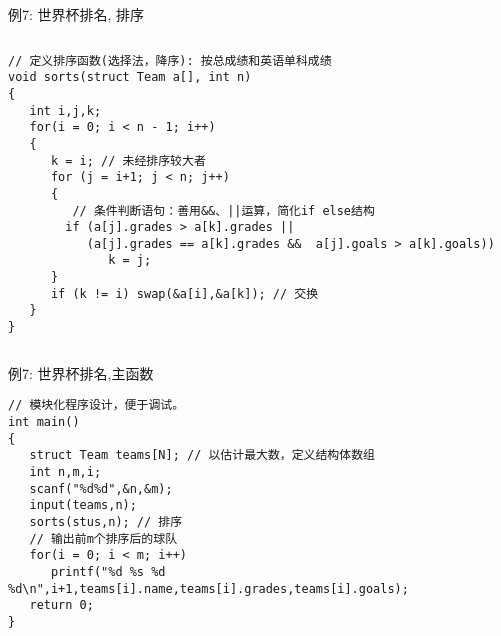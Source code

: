 \begin{frame}{例7: 世界杯排名, 排序}
\begin{columns}[T]
\begin{lstlisting}
// 定义排序函数(选择法，降序): 按总成绩和英语单科成绩 
void sorts(struct Team a[], int n)
{
   int i,j,k;
   for(i = 0; i < n - 1; i++)
   {
      k = i; // 未经排序较大者
      for (j = i+1; j < n; j++)
      {
         // 条件判断语句：善用&&、||运算，简化if else结构 
        if (a[j].grades > a[k].grades || 
           (a[j].grades == a[k].grades &&  a[j].goals > a[k].goals))  
              k = j;
      }
      if (k != i) swap(&a[i],&a[k]); // 交换
   } 
}
\end{lstlisting}
\end{columns}
\medskip
\end{frame}

\begin{frame}{例7: 世界杯排名,主函数}
\begin{lstlisting}
// 模块化程序设计，便于调试。
int main()
{
   struct Team teams[N]; // 以估计最大数，定义结构体数组 
   int n,m,i;
   scanf("%d%d",&n,&m);
   input(teams,n); 
   sorts(stus,n); // 排序
   // 输出前m个排序后的球队 
   for(i = 0; i < m; i++)
      printf("%d %s %d %d\n",i+1,teams[i].name,teams[i].grades,teams[i].goals);
   return 0;
}
\end{lstlisting}
\end{frame}

